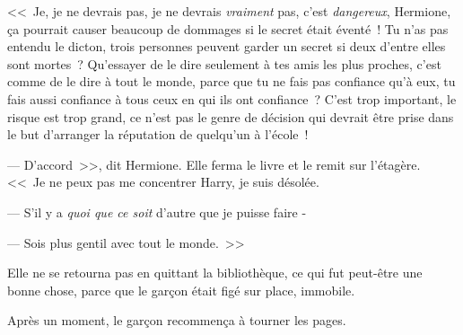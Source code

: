 <<~Je, je ne devrais pas, je ne devrais \emph{vraiment} pas, c'est \emph{dangereux}, Hermione, ça pourrait causer beaucoup de dommages si le secret était éventé~! Tu n'as pas entendu le dicton, trois personnes peuvent garder un secret si deux d'entre elles sont mortes~? Qu'essayer de le dire seulement à tes amis les plus proches, c'est comme de le dire à tout le monde, parce que tu ne fais pas confiance qu'à eux, tu fais aussi confiance à tous ceux en qui ils ont confiance~? C'est trop important, le risque est trop grand, ce n'est pas le genre de décision qui devrait être prise dans le but d'arranger la réputation de quelqu'un à l'école~!

--- D'accord~>>, dit Hermione. Elle ferma le livre et le remit sur l'étagère. <<~Je ne peux pas me concentrer Harry, je suis désolée.

--- S'il y a \emph{quoi que ce soit} d'autre que je puisse faire -

--- Sois plus gentil avec tout le monde.~>>

Elle ne se retourna pas en quittant la bibliothèque, ce qui fut peut-être une bonne chose, parce que le garçon était figé sur place, immobile.

Après un moment, le garçon recommença à tourner les pages.
